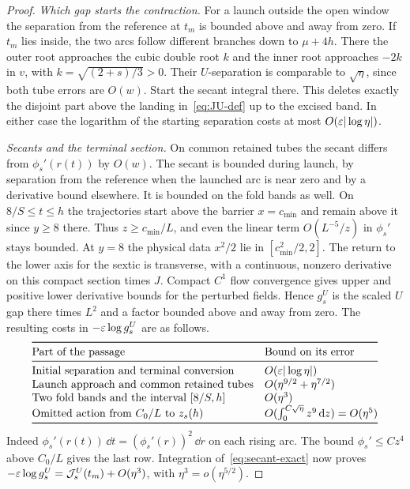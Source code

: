 \begin{proof}
\emph{Which gap starts the contraction.}
For a launch outside the open window the separation from the reference
at $t_m$ is bounded above and away from zero. If $t_m$ lies inside,
the two arcs follow different branches down to $\mu+4h$.
There the outer root approaches the cubic double root $k$ and the
inner root approaches $-2k$ in $v$, with $k=\sqrt{(2+s)/3}>0$.
Their $U$-separation is comparable to $\sqrt\eta$, since both tube
errors are $O(w)$. Start the secant integral there. This deletes
exactly the disjoint part above the landing in~\eqref{eq:JU-def}
up to the excised band. In either case the logarithm of the starting
separation costs at most $O(\varepsilon|\log\eta|)$.

\emph{Secants and the terminal section.}
On common retained tubes the secant differs from $\phi_s'(r(t))$
by $O(w)$. The secant is bounded during launch, by separation from the
reference when the launched arc is near zero and by a derivative
bound elsewhere. It is bounded on the fold bands as well. On
$8/S\le t\le h$ the trajectories start above the barrier $x=c_{\min}$
and remain above it since $y\ge8$ there. Thus $z\ge c_{\min}/L$,
and even the linear term $O(L^{-5}/z)$ in $\phi_s'$ stays bounded.
At $y=8$ the physical data $x^2/2$ lie in
$[c_{\min}^2/2,2]$. The return to the lower axis for the sextic is
transverse, with a continuous, nonzero derivative on this compact
section times $J$. Compact $C^1$ flow convergence gives upper and
positive lower derivative bounds for the perturbed fields. Hence
$g_s^U$ is the scaled $U$ gap there times $L^2$ and a factor
bounded above and away from zero. The resulting costs in $-\varepsilon\log g_s^U$
are as follows.
\[
\begin{array}{@{}ll@{}}
\toprule
\text{Part of the passage}&\text{Bound on its error}\\ \midrule
\text{Initial separation and terminal conversion}&O(\eps|\log\eta|)\\
\text{Launch approach and common retained tubes}&O(\eta^{9/2}+\eta^{7/2})\\
\text{Two fold bands and the interval }[8/S,h]&O(\eta^3)\\
\text{Omitted action from }C_0/L\text{ to } z_s(h)&
 O(\int_0^{C\sqrt\eta}z^9\,\dd z)=O(\eta^5)\\ \bottomrule
\end{array}
\]
Indeed $\phi_s'(r(t))\,\dd t=(\phi_s'(r))^2\,\dd r$ on each rising
arc. The bound $\phi_s'\le C z^4$ above $C_0/L$ gives the last row.
Integration of~\eqref{eq:secant-exact} now proves
$-\varepsilon\log g_s^U=\mathcal{J}_s^U(t_m)+O(\eta^3)$, with
$\eta^3=o(\eta^{5/2})$.


\end{proof}
